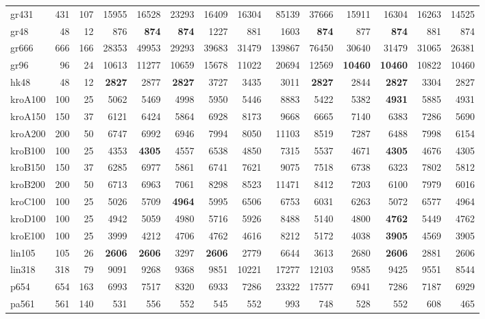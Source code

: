 {\begin{longtable}{l r r r r r r r r r r r r r}
gr431 & 431 & 107 & 15955 & 16528 & 23293 & 16409 & 16304 & 85139 & 37666 & 15911 & 16304 & 16263 & 14525 \\
gr48 & 48 & 12 & 876 & \textbf{874} & \textbf{874} & 1227 & 881 & 1603 & \textbf{874} & 877 & \textbf{874} & 881 & 874 \\
gr666 & 666 & 166 & 28353 & 49953 & 29293 & 39683 & 31479 & 139867 & 76450 & 30640 & 31479 & 31065 & 26381 \\
gr96 & 96 & 24 & 10613 & 11277 & 10659 & 15678 & 11022 & 20694 & 12569 & \textbf{10460} & \textbf{10460} & 10822 & 10460 \\
hk48 & 48 & 12 & \textbf{2827} & 2877 & \textbf{2827} & 3727 & 3435 & 3011 & \textbf{2827} & 2844 & \textbf{2827} & 3304 & 2827 \\
kroA100 & 100 & 25 & 5062 & 5469 & 4998 & 5950 & 5446 & 8883 & 5422 & 5382 & \textbf{4931} & 5885 & 4931 \\
kroA150 & 150 & 37 & 6121 & 6424 & 5864 & 6928 & 8173 & 9668 & 6665 & 7140 & 6383 & 7286 & 5690 \\
kroA200 & 200 & 50 & 6747 & 6992 & 6946 & 7994 & 8050 & 11103 & 8519 & 7287 & 6488 & 7998 & 6154 \\
kroB100 & 100 & 25 & 4353 & \textbf{4305} & 4557 & 6538 & 4850 & 7315 & 5537 & 4671 & \textbf{4305} & 4676 & 4305 \\
kroB150 & 150 & 37 & 6285 & 6977 & 5861 & 6741 & 7621 & 9075 & 7518 & 6738 & 6323 & 7802 & 5812 \\
kroB200 & 200 & 50 & 6713 & 6963 & 7061 & 8298 & 8523 & 11471 & 8412 & 7203 & 6100 & 7979 & 6016 \\
kroC100 & 100 & 25 & 5026 & 5709 & \textbf{4964} & 5995 & 6506 & 6753 & 6031 & 6263 & 5072 & 6577 & 4964 \\
kroD100 & 100 & 25 & 4942 & 5059 & 4980 & 5716 & 5926 & 8488 & 5140 & 4800 & \textbf{4762} & 5449 & 4762 \\
kroE100 & 100 & 25 & 3999 & 4212 & 4706 & 4762 & 4616 & 8212 & 5172 & 4038 & \textbf{3905} & 4569 & 3905 \\
lin105 & 105 & 26 & \textbf{2606} & \textbf{2606} & 3297 & \textbf{2606} & 2779 & 6644 & 3613 & 2680 & \textbf{2606} & 2881 & 2606 \\
lin318 & 318 & 79 & 9091 & 9268 & 9368 & 9851 & 10221 & 17277 & 12103 & 9585 & 9425 & 9551 & 8544 \\
p654 & 654 & 163 & 6993 & 7517 & 8320 & 6933 & 7286 & 23322 & 17577 & 6941 & 7286 & 7187 & 6929 \\
pa561 & 561 & 140 & 531 & 556 & 552 & 545 & 552 & 993 & 748 & 528 & 552 & 608 & 465 \\

\end{longtable}}
